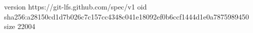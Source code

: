 version https://git-lfs.github.com/spec/v1
oid sha256:a28150cd1d7b026c7c157cc4348c041e18092ef0b6ccf1444d1e0a7875989450
size 22004
